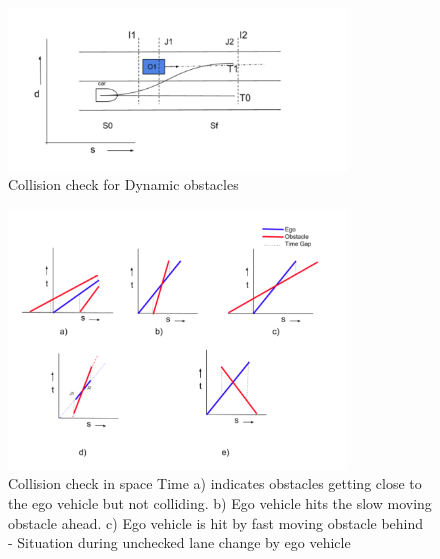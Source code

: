
 \begin{figure}[H]
    \centering
    \includegraphics[width=0.8\textwidth]{Images/dynamic_check.png}
    \caption{Collision check for Dynamic obstacles}
    \label{dynamic_check}
\end{figure}



\begin{figure}[h]
    \centering
    \includegraphics[width=0.8\textwidth]{Images/dynamic_Check_time.png}
    \caption{Collision check in space Time a) indicates obstacles getting close to the ego vehicle but not colliding. b) Ego vehicle hits the slow moving obstacle ahead. c) Ego vehicle is hit by fast moving obstacle behind - Situation during unchecked lane change by ego vehicle }
    \label{dynamic_time_check}
\end{figure}





